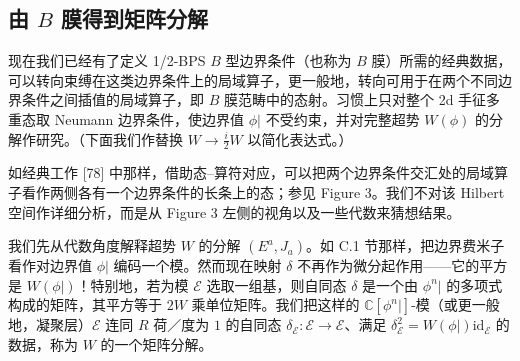 \subsection{由 $B$ 膜得到矩阵分解}
现在我们已经有了定义 1/2-BPS $B$ 型边界条件（也称为 $B$ 膜）所需的经典数据，可以转向束缚在这类边界条件上的局域算子，更一般地，转向可用于在两个不同边界条件之间插值的局域算子，即 $B$ 膜范畴中的态射。习惯上只对整个 2d 手征多重态取 Neumann 边界条件，使边界值 $\phi|$ 不受约束，并对完整超势 $W(\phi)$ 的分解作研究。（下面我们作替换 $W\to\frac{i}{2}W$ 以简化表达式。）

如经典工作 [78] 中那样，借助态–算符对应，可以把两个边界条件交汇处的局域算子看作两侧各有一个边界条件的长条上的态；参见 Figure 3。我们不对该 Hilbert 空间作详细分析，而是从 Figure 3 左侧的视角以及一些代数来猜想结果。

我们先从代数角度解释超势 $W$ 的分解 $(E^a,J_a)$。如 C.1 节那样，把边界费米子看作对边界值 $\phi|$ 编码一个模。然而现在映射 $\delta$ 不再作为微分起作用——它的平方是 $W(\phi|)$！特别地，若为模 $\mathcal{E}$ 选取一组基，则自同态 $\delta$ 是一个由 $\phi^n|$ 的多项式构成的矩阵，其平方等于 $2W$ 乘单位矩阵。我们把这样的 $\mathbb{C}[\phi^n|]$-模（或更一般地，凝聚层）$\mathcal{E}$ 连同 $R$ 荷／度为 $1$ 的自同态 $\delta_{\mathcal{E}}:\mathcal{E}\to\mathcal{E}$、满足 $\delta_{\mathcal{E}}^2=W(\phi|)\mathrm{id}_{\mathcal{E}}$ 的数据，称为 $W$ 的一个矩阵分解。

